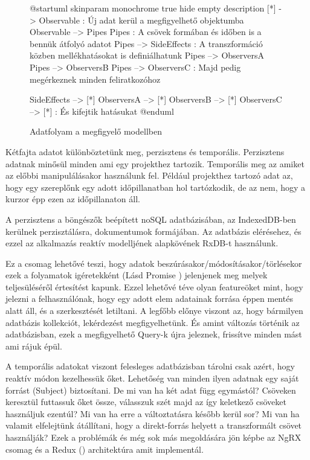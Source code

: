 \begin{figure}[h!]
	\centering
	\begin{plantuml}
		@startuml
		skinparam monochrome true
		hide empty description
		[*] -> Observable : Új adat kerül a megfigyelhető objektumba
		Observable --> Pipes
		Pipes : A csövek formában és időben is  a bennük átfolyó adatot
		Pipes --> SideEffects : A transzformáció közben mellékhatásokat is definiálhatunk
		Pipes --> ObserversA
		Pipes --> ObserversB
		Pipes --> ObserversC : Majd pedig megérkeznek minden feliratkozóhoz

		SideEffects  --> [*]
		ObserversA --> [*]
		ObserversB --> [*]
		ObserversC --> [*] : És kifejtik hatásukat
		@enduml
	\end{plantuml}
	\caption{Adatfolyam a megfigyelő modellben}
	\label{fig:observer-pattern}
\end{figure}

Kétfajta adatot különböztetünk meg, perzisztens és temporális. Perzisztens adatnak minősül minden ami egy projekthez tartozik. Temporális meg az amiket az előbbi manipulálásakor használunk fel. Például projekthez tartozó adat az, hogy egy szereplőnk egy adott időpillanatban hol tartózkodik, de az nem, hogy a kurzor épp ezen az időpillanaton áll.

A perzisztens a böngészők beépített noSQL adatbázisában, az IndexedDB-ben kerülnek perzisztálásra, dokumentumok formájában. Az adatbázis elérésehez, és ezzel az alkalmazás reaktív modelljének alapkövének RxDB-t \cite{RxDB} használunk.

Ez a csomag lehetővé teszi, hogy adatok beszúrásakor/módosításakor/törlésekor ezek a folyamatok igéretekként (Lásd Promise \cite{Promise}) jelenjenek meg melyek teljesüléséről értesítést kapunk. Ezzel lehetővé téve olyan featureöket mint, hogy jelezni a felhasználónak, hogy egy adott elem adatainak forrása éppen mentés alatt áll, és a szerkesztését letiltani. A legfőbb előnye viszont az, hogy bármilyen adatbázis kollekciót, lekérdezést megfigyelhetünk. És amint változás történik az adatbázisban, ezek a megfigyelhető Query-k újra jeleznek, frissítve minden mást ami rájuk épül.

A temporális adatokat viszont felesleges adatbázisban tárolni csak azért, hogy reaktív módon kezelhessük őket. Lehetőség van minden ilyen adatnak egy saját forrást (Subject) biztosítani. De mi van ha két adat függ egymástól? Csöveken keresztül futtassuk őket össze, válasszuk szét majd az így keletkező csöveket használjuk ezentúl? Mi van ha erre a változtatásra később kerül sor? Mi van ha valamit elfelejtünk átállítani, hogy a direkt-forrás helyett a transzformált csövet használják? Ezek a problémák és még sok más megoldására jön képbe az NgRX \cite{NgRx} csomag és a Redux (\cite{Redux}) architektúra amit implementál.


